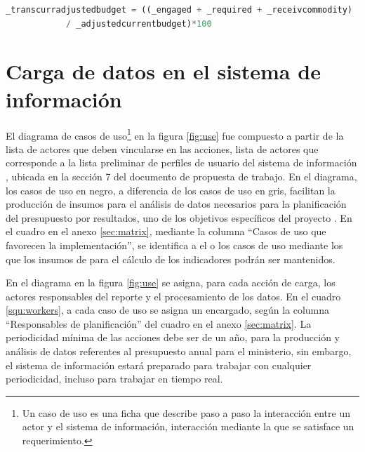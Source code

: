 \documentclass{article}
\begin{document}
\begin{multicols}{6}[]
\begin{center}
	\begin{lstlisting}[language=sql]
		_transcurradjustedbudget = ((_engaged + _required + _receivcommodity)
            / _adjustedcurrentbudget)*100
	\end{lstlisting}
	\label{sql:_transcurradjustedbudget}
\end{center}
 
\section{Carga de datos en el sistema de informaci\'on}


El diagrama de casos de uso\footnote{Un caso de uso es una ficha que describe paso a paso la interacci\'on entre un actor y el sistema de informaci\'on, interacci\'on mediante la que se satisface un requerimiento.} en la figura \ref{fig:use} fue compuesto a partir de la lista de actores que deben vincularse en las acciones, lista de actores que corresponde a la lista preliminar de perfiles de usuario del sistema de informaci\'on \cite{prop}, ubicada en la secci\'on 7 del documento de propuesta de trabajo. En el diagrama, los casos de uso en negro, a diferencia de los casos de uso en gris, facilitan la producci\'on de insumos para el an\'alisis de datos necesarios para la planificaci\'on del presupuesto por resultados, uno de los objetivos espec\'ificos del proyecto \cite{prop}. En el cuadro en el anexo \ref{sec:matrix}, mediante la columna ``Casos de uso que favorecen la implementaci\'on'', se identifica a el o los casos de uso mediante los que los insumos de para el c\'alculo de los indicadores podr\'an ser mantenidos.

En el diagrama en la figura \ref{fig:use} se asigna, para cada acci\'on de carga, los actores responsables del reporte y el procesamiento de los datos. En el cuadro \ref{squ:workers}, a cada caso de uso se asigna un encargado, seg\'un la columna ``Responsables de planificaci\'on'' del cuadro en el anexo \ref{sec:matrix}. La periodicidad m\'inima de las acciones debe ser de un a\~no, para la producci\'on y an\'alisis de datos referentes al presupuesto anual para el ministerio, sin embargo, el sistema de informaci\'on estar\'a preparado para trabajar con cualquier periodicidad, incluso para trabajar en tiempo real.


\end{multicols}
\end{document}
